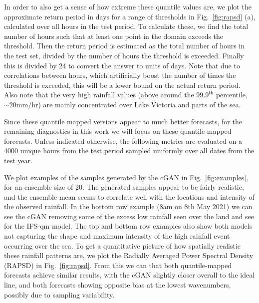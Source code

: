 \documentclass{article}
\begin{document}
In order to also get a sense of how extreme these quantile values are, we plot the approximate return period in days for a range of thresholds in Fig.~\ref{fig:rapsd} (a), calculated over all hours in the test period. To calculate these, we find the total number of hours such that at least one point in the domain exceeds the threshold. Then the return period is estimated as the total number of hours in the test set, divided by the number of hours the threshold is exceeded. Finally this is divided by 24 to convert the answer to units of days. Note that due to correlations between hours, which artificially boost the number of times the threshold is exceeded, this will be a lower bound on the actual return period. Also note that the very high rainfall values (above around the $99.9^{\text{th}}$ percentile, $\sim20\text{mm/hr}$) are mainly concentrated over Lake Victoria and parts of the sea. 

Since these quantile mapped versions appear to much better forecasts, for the remaining diagnostics in this work we will focus on these quantile-mapped forecasts. Unless indicated otherwise, the following metrics are evaluated on a 4000 unique hours from the test period sampled uniformly over all dates from the test year.

We plot examples of the samples generated by the cGAN in Fig.~\ref{fig:examples}, for an ensemble size of 20. The generated samples appear to be fairly realistic, and the ensemble mean seems to correlate well with the locations and intensity of the observed rainfall. In the bottom row example (8am on 8th May 2021) we can see the cGAN removing some of the excess low rainfall seen over the land and see for the IFS-qm model. The top and bottom row examples also show both models not capturing the shape and maximum intensity of the high rainfall event occurring over the sea. To get a quantitative picture of how spatially realistic these rainfall patterns are, we plot the Radially Averaged Power Spectral Density (RAPSD) in Fig.~\ref{fig:rapsd}. From this we can that both quantile-mapped forecasts achieve similar results, with the cGAN slightly closer overall to the ideal line, and both forecasts showing opposite bias at the lowest wavenumbers, possibly due to sampling variability.
\end{document}
